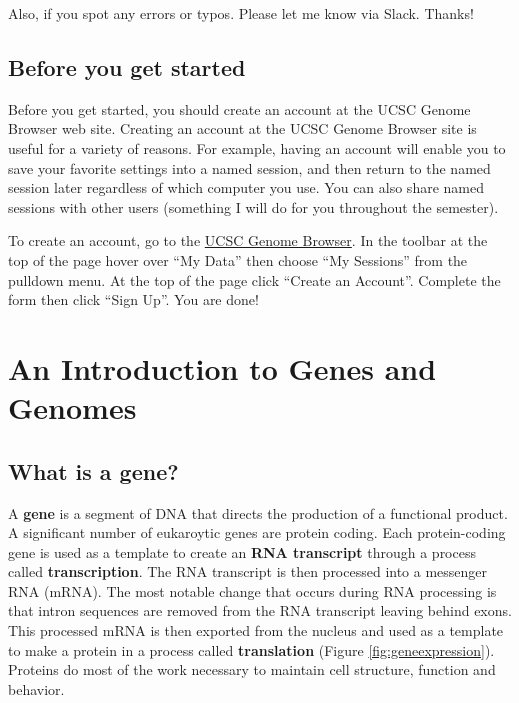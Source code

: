 \documentclass[
]{book}
\begin{document}
Also, if you spot any errors or typos. Please let me know via Slack. Thanks!

\hypertarget{before-you-get-started}{%
\section*{Before you get started}\label{before-you-get-started}}

Before you get started, you should create an account at the UCSC Genome Browser web site. Creating an account at the UCSC Genome Browser site is useful for a variety of reasons. For example, having an account will enable you to save your favorite settings into a named session, and then return to the named session later regardless of which computer you use. You can also share named sessions with other users (something I will do for you throughout the semester).

To create an account, go to the \href{https://genome.ucsc.edu/}{UCSC Genome Browser}. In the toolbar at the top of the page hover over ``My Data'' then choose ``My Sessions'' from the pulldown menu. At the top of the page click ``Create an Account''. Complete the form then click ``Sign Up''. You are done!

\hypertarget{an-introduction-to-genes-and-genomes}{%
\chapter{An Introduction to Genes and Genomes}\label{an-introduction-to-genes-and-genomes}}

\hypertarget{what-is-a-gene}{%
\section{What is a gene?}\label{what-is-a-gene}}

A \textbf{gene} is a segment of DNA that directs the production of a functional product. A significant number of eukaroytic genes are protein coding. Each protein-coding gene is used as a template to create an \textbf{RNA transcript} through a process called \textbf{transcription}. The RNA transcript is then processed into a messenger RNA (mRNA). The most notable change that occurs during RNA processing is that intron sequences are removed from the RNA transcript leaving behind exons. This processed mRNA is then exported from the nucleus and used as a template to make a protein in a process called \textbf{translation} (Figure \ref{fig:geneexpression}). Proteins do most of the work necessary to maintain cell structure, function and behavior.
\end{document}

